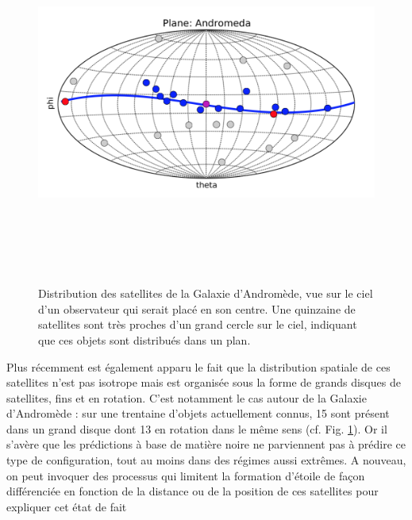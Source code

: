 \begin{figure}[htbp]
	\centering
		\includegraphics[height=12cm]{figs/planM31.png}
	\caption[Distribution des satellites de la Galaxie d'Andromède]{Distribution des satellites de la Galaxie d'Andromède, vue sur le ciel d'un observateur qui serait placé en son centre. Une quinzaine de satellites sont très proches d'un grand cercle sur le ciel, indiquant que ces objets sont distribués dans un plan.} 
	\label{f:planM31}
\end{figure}

Plus récemment est également apparu le fait que la distribution spatiale de ces satellites n'est pas isotrope mais est organisée sous la forme de grands disques de satellites, fins et en rotation. C'est notamment le cas autour de la Galaxie d'Andromède : sur une trentaine d'objets actuellement connus, 15 sont présent dans un grand disque dont 13 en rotation dans le même sens (cf. Fig. \ref{f:planM31}). Or il s'avère que les prédictions à base de matière noire ne parviennent pas à prédire ce type de configuration, tout au moins dans des régimes aussi extrêmes.  A nouveau, on peut invoquer des processus qui limitent la formation d'étoile de façon différenciée en fonction de la distance ou de la position de ces satellites pour expliquer cet état de fait 

